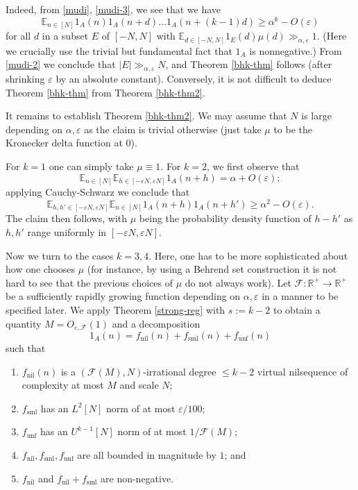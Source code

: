 \documentclass[11pt,reqno]{amsart}
\numberwithin{equation}{section}
\theoremstyle{plain}
\theoremstyle{definition}
\renewcommand{\leq}{\leqslant}
\renewcommand{\geq}{\geqslant}
\newcommand\E{{\mathbb{E}}}
\newcommand\R{\mathbb{R}}
\newcommand\1{{\bf 1}}
\newcommand\2{{\bf 2}}
\newcommand\eps{\varepsilon}
\newcommand\nil{{\operatorname{nil}}}
\newcommand\sml{{\operatorname{sml}}}
\newcommand\unf{{\operatorname{unf}}}
\newcommand\Grow{{\mathcal F}}
\begin{document}
Indeed, from \eqref{mudi}, \eqref{mudi-3}, we see that we have
$$
 \E_{n \in [N]} 1_A(n) 1_A(n+d) \ldots 1_A(n+(k-1)d) \geq \alpha^k - O(\eps)$$
for all $d$ in a subset $E$ of $[-N,N]$ with $\E_{d \in [-N,N]} 1_E(d) \mu(d) \gg_{\alpha,\eps} 1$.  (Here we crucially use the trivial but fundamental fact that $1_A$ is nonnegative.)  From \eqref{mudi-2} we conclude that $|E| \gg_{\alpha,\eps} N$, and Theorem \ref{bhk-thm} follows (after shrinking $\eps$ by an absolute constant). Conversely, it is not difficult to deduce Theorem \ref{bhk-thm} from Theorem \ref{bhk-thm2}.

It remains to establish Theorem \ref{bhk-thm2}.  We may assume that $N$ is large depending on $\alpha,\eps$ as the claim is trivial otherwise (just take $\mu$ to be the Kronecker delta function at $0$).

For $k=1$ one can simply take $\mu \equiv 1$.  For $k=2$, we first observe that
$$ \E_{n \in [N]} \E_{h \in [-\eps N,\eps N]} 1_A(n+h) = \alpha + O(\eps);$$
applying Cauchy-Schwarz we conclude that
$$ \E_{h,h' \in [-\eps N,\eps N]} \E_{n \in [N]} 1_A(n+h) 1_A(n+h') \geq \alpha^2 - O(\eps).$$
The claim then follows, with $\mu$ being the probability density function of $h-h'$ as $h,h'$ range uniformly in $[-\eps N, \eps N]$.

Now we turn to the cases $k=3,4$.  Here, one has to be more sophisticated about how one chooses $\mu$ (for instance,  by using a Behrend set construction it is not hard to see that the previous choices of $\mu$ do not always work).
Let $\Grow: \R^+ \to \R^+$ be a sufficiently rapidly growing function depending on $\alpha,\eps$ in a manner to be specified later.  We apply Theorem \ref{strong-reg} with $s:=k-2$ to obtain a quantity $M = O_{\eps,\Grow}(1)$ and a decomposition
\begin{equation}\label{decomposition} 1_A(n) = f_{\nil}(n) + f_{\sml}(n) + f_{\unf}(n)\end{equation}
such that
\begin{enumerate}
\item $f_\nil(n)$ is a $(\Grow(M),N)$-irrational degree $\leq k-2$ virtual nilsequence of complexity at most $M$ and scale $N$;
\item $f_\sml$ has an $L^2[N]$ norm of at most $\eps/100$;
\item $f_\unf$ has an $U^{k-1}[N]$ norm of at most $1/\Grow(M)$;
\item $f_\nil, f_\sml, f_\unf$ are all bounded in magnitude by $1$; and
\item $f_\nil$ and $f_{\nil} + f_{\sml}$ are non-negative.
\end{enumerate}
\end{document}
